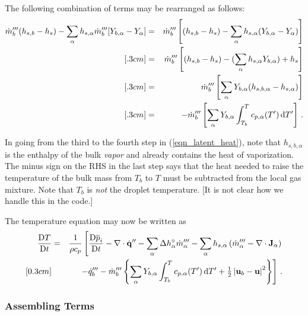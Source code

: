 The following combination of terms may be rearranged as follows:
\begin{eqnarray}
\label{eqn_latent_heat}
\dot{m}_{b}^{{\prime\prime\prime}} ( h_{s,b} - h_s ) - \sum_\alpha h_{s,\alpha} \dot{m}_{b}^{{\prime\prime\prime}}[Y_{b,\alpha} - Y_\alpha] &=&  \dot{m}_{b}^{{\prime\prime\prime}} \left[ ( h_{s,b} - h_s ) - \sum_\alpha h_{s,\alpha} (Y_{b,\alpha} - Y_\alpha) \right] \nonumber\\ [.3cm]
&=&  \dot{m}_{b}^{{\prime\prime\prime}} \left[ ( h_{s,b} - h_s ) - (\sum_\alpha h_{s,\alpha} Y_{b,\alpha}) + h_s \right] \nonumber\\  [.3cm]
&=&  \dot{m}_{b}^{{\prime\prime\prime}} \left[ \sum_\alpha Y_{b,\alpha} (h_{s,b,\alpha}-h_{s,\alpha}) \right] \nonumber\\  [.3cm]
&=&  -\dot{m}_{b}^{{\prime\prime\prime}} \left[ \sum_\alpha Y_{b,\alpha} \int_{T_b}^{T} c_{p,\alpha}(T^\prime) \,\mbox{d}T^\prime \right] \,\mbox{.}
\end{eqnarray}
\vspace{0.3cm}

\noindent In going from the third to the fourth step in (\ref{eqn_latent_heat}), note that $h_{s,b,\alpha}$ is the enthalpy of the bulk \emph{vapor} and already contains the heat of vaporization.  The minus sign on the RHS in the last step says that the heat needed to raise the temperature of the bulk mass from $T_b$ to $T$ must be subtracted from the local gas mixture.  Note that $T_b$ is \emph{not} the droplet temperature. [It is not clear how we handle this in the code.]

The temperature equation may now be written as
\begin{eqnarray}
\label{eqn_DTDt}
\frac{\mbox{D} T}{\mbox{D} t} &=& \frac{1}{\rho c_p} \left[\frac{\mbox{D} \overline{p}_i }{\mbox{D} t}
- \nabla\cdot\dot{\mathbf{q}}^{\prime\prime} - \sum_\alpha \Delta h^\circ_\alpha \dot{m}_\alpha^{{\prime\prime\prime}} - \sum_\alpha h_{s,\alpha}\left(  \dot{m}_\alpha^{{\prime\prime\prime}} - \nabla\cdot \mathbf{J}_{\alpha} \right) \right. \nonumber\\ [0.3cm]
& & \left. - \dot{q}_b^{\prime\prime\prime} -\dot{m}_{b}^{{\prime\prime\prime}} \left\{\sum_\alpha Y_{b,\alpha} \int_{T_b}^{T} c_{p,\alpha}(T^\prime) \,\mbox{d}T^\prime + \mbox{$\frac{1}{2}$}\left|\mathbf{u}_b-\mathbf{u}\right|^2 \right\} \right] \,\mbox{.}
\end{eqnarray}

\subsubsection{Assembling Terms}
\label{putting_it_all_together}

